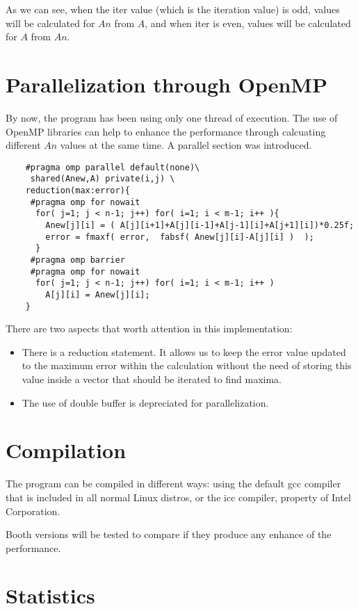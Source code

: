 \documentclass{article}
\begin{document}
	As we can see, when the iter value (which is the
	iteration value) is odd, values will be calculated for $An$ from $A$,
	and when iter is even, values will be calculated for $A$ from $An$.
	
\section {Parallelization through OpenMP}

	By now, the program has been using only one thread of execution. The
	use of OpenMP libraries can help to enhance the performance through
	calcuating different $An$ values at the same time. A parallel
	section was introduced.

	\begin{verbatim}
	#pragma omp parallel default(none)\
	 shared(Anew,A) private(i,j) \
	reduction(max:error){
	 #pragma omp for nowait
	  for( j=1; j < n-1; j++) for( i=1; i < m-1; i++ ){
	    Anew[j][i] = ( A[j][i+1]+A[j][i-1]+A[j-1][i]+A[j+1][i])*0.25f;
	    error = fmaxf( error,  fabsf( Anew[j][i]-A[j][i] )  );
	  }
	 #pragma omp barrier
	 #pragma omp for nowait
	  for( j=1; j < n-1; j++) for( i=1; i < m-1; i++ )
	    A[j][i] = Anew[j][i];
	}

	\end{verbatim}

	There are two aspects that worth attention in this implementation:

	\begin{itemize}
		\item There is a reduction statement. It allows us
		to keep the error value updated to the maximum
		error within the calculation without the need
		of storing this value inside a vector that
		should be iterated to find maxima.
		\item The use of double buffer is depreciated for
		parallelization.
	\end{itemize}

\section{Compilation}

	The program can be compiled in different ways: using the default
	gcc compiler that is included in all normal Linux distros,
	or the icc compiler, property of Intel Corporation.

	Booth versions will be tested to compare if
	they produce any enhance of the performance.

\section{Statistics}
\end{document}

